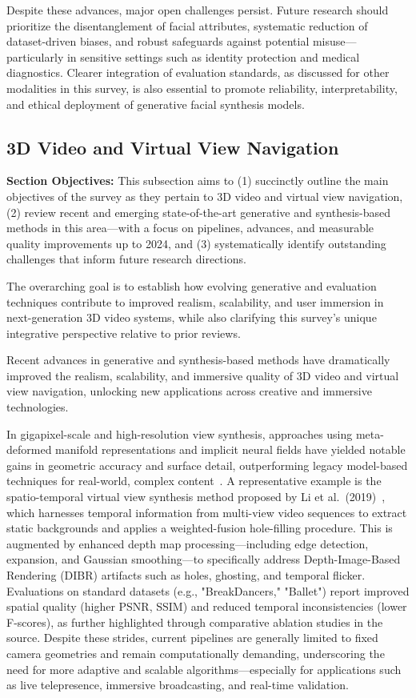 \documentclass[sigconf]{acmart}
\begin{document}
Despite these advances, major open challenges persist. Future research should prioritize the disentanglement of facial attributes, systematic reduction of dataset-driven biases, and robust safeguards against potential misuse—particularly in sensitive settings such as identity protection and medical diagnostics. Clearer integration of evaluation standards, as discussed for other modalities in this survey, is also essential to promote reliability, interpretability, and ethical deployment of generative facial synthesis models.

\subsection{3D Video and Virtual View Navigation}

\textbf{Section Objectives:} This subsection aims to (1) succinctly outline the main objectives of the survey as they pertain to 3D video and virtual view navigation, (2) review recent and emerging state-of-the-art generative and synthesis-based methods in this area---with a focus on pipelines, advances, and measurable quality improvements up to 2024, and (3) systematically identify outstanding challenges that inform future research directions.

The overarching goal is to establish how evolving generative and evaluation techniques contribute to improved realism, scalability, and user immersion in next-generation 3D video systems, while also clarifying this survey's unique integrative perspective relative to prior reviews.

Recent advances in generative and synthesis-based methods have dramatically improved the realism, scalability, and immersive quality of 3D video and virtual view navigation, unlocking new applications across creative and immersive technologies.

In gigapixel-scale and high-resolution view synthesis, approaches using meta-deformed manifold representations and implicit neural fields have yielded notable gains in geometric accuracy and surface detail, outperforming legacy model-based techniques for real-world, complex content~\cite{ref98}. A representative example is the spatio-temporal virtual view synthesis method proposed by Li et al.~(2019)~\cite{ref98}, which harnesses temporal information from multi-view video sequences to extract static backgrounds and applies a weighted-fusion hole-filling procedure. This is augmented by enhanced depth map processing---including edge detection, expansion, and Gaussian smoothing---to specifically address Depth-Image-Based Rendering (DIBR) artifacts such as holes, ghosting, and temporal flicker. Evaluations on standard datasets (e.g., "BreakDancers," "Ballet") report improved spatial quality (higher PSNR, SSIM) and reduced temporal inconsistencies (lower F-scores), as further highlighted through comparative ablation studies in the source. Despite these strides, current pipelines are generally limited to fixed camera geometries and remain computationally demanding, underscoring the need for more adaptive and scalable algorithms---especially for applications such as live telepresence, immersive broadcasting, and real-time validation.
\end{document}
